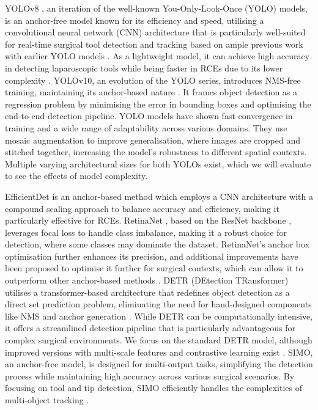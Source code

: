YOLOv8 \cite{jocher_ultralytics_2023}, an iteration of the well-known You-Only-Look-Once (YOLO) models, is an anchor-free model known for its efficiency and speed, utilising a convolutional neural network (CNN) architecture that is particularly well-suited for real-time surgical tool detection and tracking based on ample previous work with earlier YOLO models \cite{raja_performance_2024, redmon_you_2016, yolo7_2024, wang_visual_2022, cho_automatic_2021, choi_surgical-tools_2017, jo_robust_2019, benavides_real-time_2024}. As a lightweight model, it can achieve high accuracy in detecting laparoscopic tools while being faster in RCEs due to its lower complexity \cite{yolo7_2024}. YOLOv10, an evolution of the YOLO series, introduces NMS-free training, maintaining its anchor-based nature \cite{ultralytics_yolov10_2024}. It frames object detection as a regression problem by minimising the error in bounding boxes and optimising the end-to-end detection pipeline. YOLO models have shown fast convergence in training and a wide range of adaptability across various domains. They use mosaic augmentation to improve generalisation, where images are cropped and stitched together, increasing the model's robustness to different spatial contexts. Multiple varying architectural sizes for both YOLOs exist, which we will evaluate to see the effects of model complexity.

EfficientDet \cite{tan_efficientdet_2019} is an anchor-based method which employs a CNN architecture with a compound scaling approach to balance accuracy and efficiency, making it particularly effective for RCEs. RetinaNet \cite{zlocha_improving_2019}, based on the ResNet backbone \cite{he_deep_2015}, leverages focal loss \cite{lin_focal_2017} to handle class imbalance, making it a robust choice for detection, where some classes may dominate the dataset. RetinaNet's anchor box optimisation further enhances its precision, and additional improvements have been proposed to optimise it further for surgical contexts, which can allow it to outperform other anchor-based methods \cite{zlocha_martinzlochaanchor-optimization_2024}. DETR (DEtection TRansformer) utilises a transformer-based architecture that redefines object detection as a direct set prediction problem, eliminating the need for hand-designed components like NMS and anchor generation \cite{10.1007/978-3-030-58452-8_13}. While DETR can be computationally intensive, it offers a streamlined detection pipeline that is particularly advantageous for complex surgical environments. We focus on the standard DETR model, although improved versions with multi-scale features and contrastive learning exist \cite{loza_realtime_2024}. SIMO, an anchor-free model, is designed for multi-output tasks, simplifying the detection process while maintaining high accuracy across various surgical scenarios. By focusing on tool and tip detection, SIMO efficiently handles the complexities of multi-object tracking \cite{hasan_detection_2021}.

